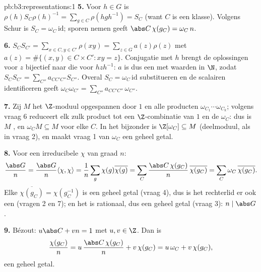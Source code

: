 \begin{solution}{pb:b3:representations:1}
\textbf{5.} Voor $h \in G$ is $\rho(h)S_C\rho(h)^{-1} = \sum_{g\in
C}\rho(hgh^{-1}) = S_C$ (want $C$ is een klasse). Volgens Schur is
$S_C = \omega_C\,\mathrm{id}$; sporen nemen geeft $\abs
C\,\chi(g_C) = \omega_C\, n$.

\textbf{6.} $S_CS_{C'} = \sum_{x \in C, y \in C'}\rho(xy) =
\sum_{z \in G} a(z)\rho(z)$ met $a(z) = \#\{(x,y) \in C\times C' :
xy = z\}$. Conjugatie met $h$ brengt de oplossingen voor $z$
bijectief naar die voor $hzh^{-1}$: $a$ is dus een 
met waarden in $\N$, zodat $S_CS_{C'} =
\sum_{C''}a_{CC'C''}S_{C''}$. Overal $S_C = \omega_C\,\mathrm{id}$
substitueren en de scalairen identificeren geeft
$\omega_C\omega_{C'} = \sum_{C''}a_{CC'C''}\,\omega_{C''}$.

\textbf{7.} Zij $M$ het $\Z$-moduul opgespannen door $1$ en alle
producten $\omega_{C_1}\cdots\omega_{C_k}$; volgens vraag 6
reduceert elk zulk product tot een $\Z$-combinatie van $1$ en de
$\omega_C$: dus is $M$ , en $\omega_C M
\subseteq M$ voor elke $C$. In het bijzonder is $\Z[\omega_C]
\subseteq M$  (deelmoduul, als in vraag 2), en
maakt vraag 1 van $\omega_C$ een geheel  getal.

\textbf{8.} Voor een irreducibele $\chi$ van graad $n$:
\[
\frac{\abs G}{n} = \frac{\abs G}{n}\langle\chi,\chi\rangle
= \frac1n \sum_{g}\chi(g)\overline{\chi(g)}
= \sum_{C}\frac{\abs C\,\chi(g_C)}{n}\,\overline{\chi(g_C)}
= \sum_C \omega_C\,\overline{\chi(g_C)} .
\]
Elke $\overline{\chi(g_C)} = \chi(g_C^{-1})$ is een geheel
 getal (vraag 4), dus is het rechterlid er ook een
(vragen 2 en 7); en het is rationaal, dus een geheel getal (vraag
3): $n \mid \abs G$.

\textbf{9.} Bézout: $u\abs C + vn = 1$ met $u, v \in \Z$. Dan is
\[
\frac{\chi(g_C)}{n} = u\,\frac{\abs C\,\chi(g_C)}{n} +
v\,\chi(g_C) = u\,\omega_C + v\,\chi(g_C),
\]
een geheel  getal.


\end{solution}
